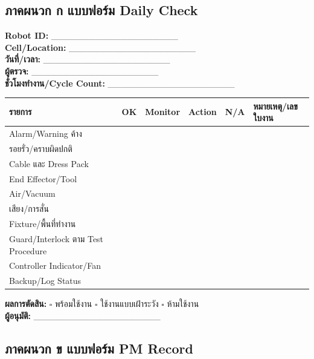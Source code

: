 \subsection{ภาคผนวก ก แบบฟอร์ม Daily Check}

\textbf{Robot ID:} \_\_\_\_\_\_\_\_\_\_\_\_\_\_\_\_\_\_\_\_ \\
\textbf{Cell/Location:} \_\_\_\_\_\_\_\_\_\_\_\_\_\_\_\_\_\_\_\_ \\
\textbf{วันที่/เวลา:} \_\_\_\_\_\_\_\_\_\_\_\_\_\_\_\_\_\_\_\_ \\
\textbf{ผู้ตรวจ:} \_\_\_\_\_\_\_\_\_\_\_\_\_\_\_\_\_\_\_\_ \\
\textbf{ชั่วโมงทำงาน/Cycle Count:} \_\_\_\_\_\_\_\_\_\_\_\_\_\_\_\_\_\_\_\_

\begin{table}[htbp]
    \centering
    \small
    \begin{tabularx}{\textwidth}{@{}L{0.30\textwidth}c c c c Y@{}}
        \hline
        \textbf{รายการ} & \textbf{OK} & \textbf{Monitor} & \textbf{Action} & \textbf{N/A} & \textbf{หมายเหตุ/เลขใบงาน} \\
        \hline
        Alarm/Warning ค้าง &  &  &  &  &  \\
        รอยรั่ว/คราบผิดปกติ &  &  &  &  &  \\
        Cable และ Dress Pack &  &  &  &  &  \\
        End Effector/Tool &  &  &  &  &  \\
        Air/Vacuum &  &  &  &  &  \\
        เสียง/การสั่น &  &  &  &  &  \\
        Fixture/พื้นที่ทำงาน &  &  &  &  &  \\
        Guard/Interlock ตาม Test Procedure &  &  &  &  &  \\
        Controller Indicator/Fan &  &  &  &  &  \\
        Backup/Log Status &  &  &  &  &  \\
        \hline
    \end{tabularx}
\end{table}

\textbf{ผลการตัดสิน:} \(\square\) พร้อมใช้งาน \(\square\) ใช้งานแบบเฝ้าระวัง \(\square\) ห้ามใช้งาน \\
\textbf{ผู้อนุมัติ:} \_\_\_\_\_\_\_\_\_\_\_\_\_\_\_\_\_\_\_\_



\subsection{ภาคผนวก ข แบบฟอร์ม PM Record}

